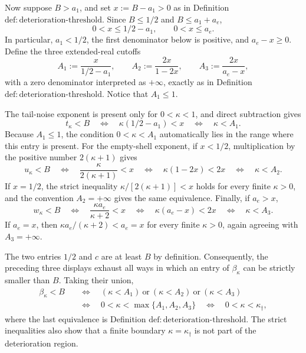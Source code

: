 Now suppose \(B>a_1\), and set \(x:=B-a_1>0\) as in Definition \(\mathrm{def{:}deterioration\mbox{-}threshold}\).  Since \(B\leq1/2\) and \(B\leq a_1+a_e\),
\[
0<x\leq 1/2-a_1,
\qquad
0<x\leq a_e.
\]
In particular, \(a_1<1/2\), the first denominator below is positive, and \(a_e-x\geq0\).  Define the three extended-real cutoffs
\[
A_1:=\frac{x}{1/2-a_1},
\qquad
A_2:=\frac{2x}{1-2x},
\qquad
A_3:=\frac{2x}{a_e-x},
\]
with a zero denominator interpreted as \(+\infty\), exactly as in Definition \(\mathrm{def{:}deterioration\mbox{-}threshold}\).  Notice that \(A_1\leq1\).

The tail-noise exponent is present only for \(0<\kappa<1\), and direct subtraction gives
\[
t_\kappa<B
\quad\Longleftrightarrow\quad
\kappa(1/2-a_1)<x
\quad\Longleftrightarrow\quad
\kappa<A_1.
\]
Because \(A_1\leq1\), the condition \(0<\kappa<A_1\) automatically lies in the range where this entry is present.  For the empty-shell exponent, if \(x<1/2\), multiplication by the positive number \(2(\kappa+1)\) gives
\[
u_\kappa<B
\quad\Longleftrightarrow\quad
\frac{\kappa}{2(\kappa+1)}<x
\quad\Longleftrightarrow\quad
\kappa(1-2x)<2x
\quad\Longleftrightarrow\quad
\kappa<A_2.
\]
If \(x=1/2\), the strict inequality \(\kappa/[2(\kappa+1)]<x\) holds for every finite \(\kappa>0\), and the convention \(A_2=+\infty\) gives the same equivalence.  Finally, if \(a_e>x\),
\[
w_\kappa<B
\quad\Longleftrightarrow\quad
\frac{\kappa a_e}{\kappa+2}<x
\quad\Longleftrightarrow\quad
\kappa(a_e-x)<2x
\quad\Longleftrightarrow\quad
\kappa<A_3.
\]
If \(a_e=x\), then \(\kappa a_e/(\kappa+2)<a_e=x\) for every finite \(\kappa>0\), again agreeing with \(A_3=+\infty\).

The two entries \(1/2\) and \(c\) are at least \(B\) by definition.  Consequently, the preceding three displays exhaust all ways in which an entry of \(\beta_\kappa\) can be strictly smaller than \(B\).  Taking their union,
\[
\begin{aligned}
\beta_\kappa<B
&\quad\Longleftrightarrow\quad
(\kappa<A_1)\ \text{or}\ (\kappa<A_2)\ \text{or}\ (\kappa<A_3)\\
&\quad\Longleftrightarrow\quad
0<\kappa<\max\{A_1,A_2,A_3\}
\quad\Longleftrightarrow\quad
0<\kappa<\kappa_\dagger,
\end{aligned}
\]
where the last equivalence is Definition \(\mathrm{def{:}deterioration\mbox{-}threshold}\).  The strict inequalities also show that a finite boundary \(\kappa=\kappa_\dagger\) is not part of the deterioration region.

